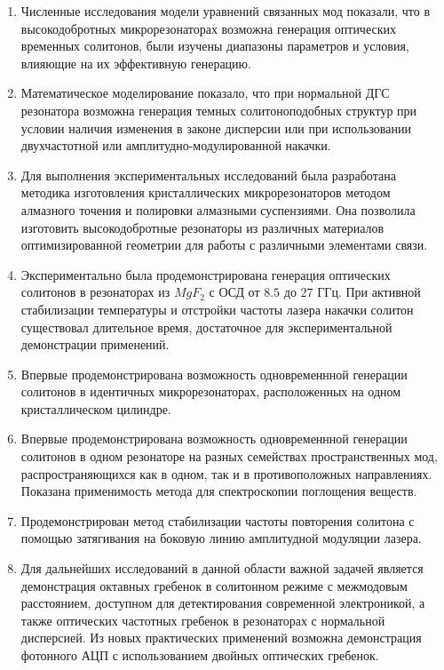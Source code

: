 \begin{enumerate}
  \item Численные исследования модели уравнений связанных мод показали, что в высокодобротных микрорезонаторах возможна генерация оптических временных солитонов, были изучены диапазоны параметров и условия, влияющие на их эффективную генерацию.
  \item Математическое моделирование показало, что при нормальной ДГС резонатора возможна генерация темных солитоноподобных структур при условии наличия изменения в законе дисперсии или при использовании двухчастотной или амплитудно-модулированной накачки.
  \item Для выполнения экспериментальных исследований была разработана методика изготовления кристаллических микрорезонаторов методом алмазного точения и полировки алмазными суспензиями. Она позволила изготовить высокодобротные резонаторы из различных материалов оптимизированной геометрии для работы с различными элементами связи.
  \item Экспериментально была продемонстрирована генерация оптических солитонов в резонаторах из $MgF_2$ с ОСД от $8.5$ до $27$ ГГц. При активной стабилизации температуры и отстройки частоты лазера накачки солитон существовал длительное время, достаточное для экспериментальной демонстрации применений.
  \item Впервые продемонстрирована возможность одновременнной генерации солитонов в идентичных микрорезонаторах, расположенных на одном кристаллическом цилиндре.
  \item Впервые продемонстрирована возможность одновременнной генерации солитонов в одном резонаторе на разных семействах пространственных мод, распространяющихся как в одном, так и в противоположных направлениях. Показана применимость метода для спектроскопии поглощения веществ.
  \item Продемонстрирован метод стабилизации частоты повторения солитона с помощью затягивания на боковую линию амплитудной модуляции лазера. 
  \item Для дальнейших исследований в данной области важной задачей является демонстрация октавных гребенок в солитонном режиме с межмодовым расстоянием, доступном для детектирования современной электроникой, а также оптических частотных гребенок в резонаторах с нормальной дисперсией. Из новых практических применений возможна демонстрация фотонного АЦП с использованием двойных оптических гребенок.
\end{enumerate}
